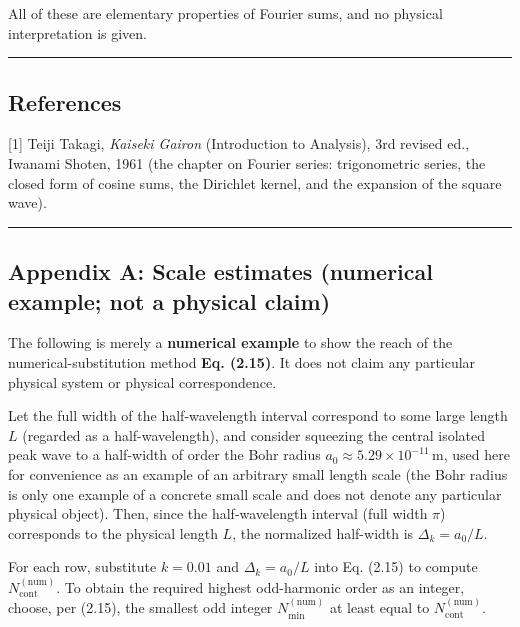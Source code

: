 \documentclass[
]{ltjsarticle}
\begin{document}
All of these are elementary properties of Fourier sums, and no physical
interpretation is given.

\begin{center}\rule{0.5\linewidth}{0.5pt}\end{center}

\subsection{References}\label{references}

{[}1{]} Teiji Takagi, \emph{Kaiseki Gairon} (Introduction to Analysis),
3rd revised ed., Iwanami Shoten, 1961 (the chapter on Fourier series:
trigonometric series, the closed form of cosine sums, the Dirichlet
kernel, and the expansion of the square wave).

\begin{center}\rule{0.5\linewidth}{0.5pt}\end{center}

\subsection{Appendix A: Scale estimates (numerical example; not a
physical
claim)}\label{appendix-a-scale-estimates-numerical-example-not-a-physical-claim}

The following is merely a \textbf{numerical example} to show the reach
of the numerical-substitution method \textbf{Eq. (2.15)}. It does not
claim any particular physical system or physical correspondence.

Let the full width of the half-wavelength interval correspond to some
large length \(L\) (regarded as a half-wavelength), and consider
squeezing the central isolated peak wave to a half-width of order the
Bohr radius \(a_0\approx5.29\times10^{-11}\,\mathrm{m}\), used here for
convenience as an example of an arbitrary small length scale (the Bohr
radius is only one example of a concrete small scale and does not denote
any particular physical object). Then, since the half-wavelength
interval (full width \(\pi\)) corresponds to the physical length \(L\),
the normalized half-width is \(\Delta_k=a_0/L\).

For each row, substitute \(k=0.01\) and \(\Delta_k=a_0/L\) into Eq.
(2.15) to compute \(N_{\mathrm{cont}}^{(\mathrm{num})}\). To obtain the
required highest odd-harmonic order as an integer, choose, per (2.15),
the smallest odd integer \(N_{\min}^{(\mathrm{num})}\) at least equal to
\(N_{\mathrm{cont}}^{(\mathrm{num})}\).
\end{document}
